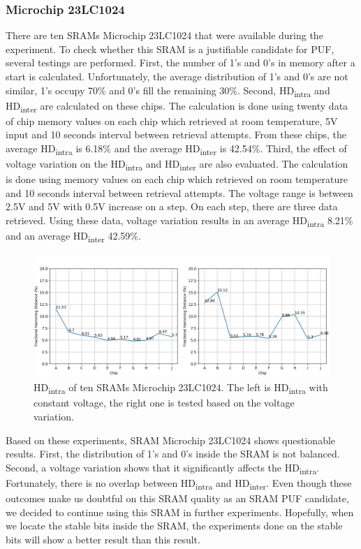 \subsubsection{Microchip 23LC1024}
There are ten SRAMs Microchip 23LC1024 that were available during the experiment. To check whether this SRAM is a justifiable candidate for PUF, several testings are performed.
First, the number of 1's and 0's in memory after a start is calculated. Unfortunately, the average distribution of 1's and 0's are not similar, 1's occupy 70\% and 0's fill the remaining 30\%.
Second, HD\textsubscript{intra} and HD\textsubscript{inter} are calculated on these chips. The calculation is done using twenty data of chip memory values on each chip which retrieved at room temperature, 5V input and 10 seconds interval between retrieval attempts. From these chips, the average HD\textsubscript{intra} is 6.18\% and the average HD\textsubscript{inter} is 42.54\%.
Third, the effect of voltage variation on the HD\textsubscript{intra} and HD\textsubscript{inter} are also evaluated. The calculation is done using memory values on each chip which retrieved on room temperature and 10 seconds interval between retrieval attempts. The voltage range is between 2.5V and 5V with 0.5V increase on a step. On each step, there are three data retrieved. Using these data, voltage variation results in an average HD\textsubscript{intra} 8.21\% and an average HD\textsubscript{inter} 42.59\%.

\begin{figure}[tph!]
    \centerline{\includegraphics[width={\textwidth}]{images/23lc1024_hd_intra}}
    \caption{HD\textsubscript{intra} of ten SRAMs Microchip 23LC1024. The left is HD\textsubscript{intra} with constant voltage, the right one is tested based on the voltage variation.}
    \label{fig:23lc1024_hd_intra}
\end{figure}

Based on these experiments, SRAM Microchip 23LC1024 shows questionable results. First, the distribution of 1's and 0's inside the SRAM is not balanced. Second, a voltage variation shows that it significantly affects the  HD\textsubscript{intra}. Fortunately, there is no overlap between HD\textsubscript{intra} and HD\textsubscript{inter}. Even though these outcomes make us doubtful on this SRAM quality as an SRAM PUF candidate, we decided to continue using this SRAM in further experiments. Hopefully, when we locate the stable bits inside the SRAM, the experiments done on the stable bits will show a better result than this result.


